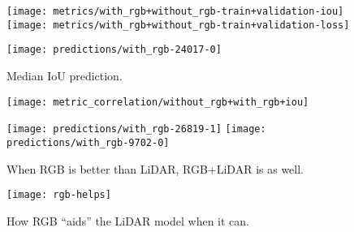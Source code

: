 \begin{figure}[H]
  \centering
  \texttt{[image: metrics/with\_rgb+without\_rgb-train+validation-iou]}
  \texttt{[image: metrics/with\_rgb+without\_rgb-train+validation-loss]}
\end{figure}

\begin{figure}[H]
  \centering
  \texttt{[image: predictions/with\_rgb-24017-0]}  %
  \caption{%
    Median IoU prediction.
  }
\end{figure}

\begin{figure}[H]
  \centering
  \texttt{[image: metric\_correlation/without\_rgb+with\_rgb+iou]}
\end{figure}

\begin{figure}[H]
  \centering
  \texttt{[image: predictions/with\_rgb-26819-1]}  %
  \textcolor{gray}{\vrule}
  \texttt{[image: predictions/with\_rgb-9702-0]}  %
  \caption{%
    When RGB is better than LiDAR, RGB+LiDAR is as well.
  }
\end{figure}

\begin{figure}[H]
  \centering
  \texttt{[image: rgb-helps]}
  \caption{%
    How RGB \enquote{aids} the LiDAR model when it can.
  }
  \label{fig:rgb-help}
\end{figure}
